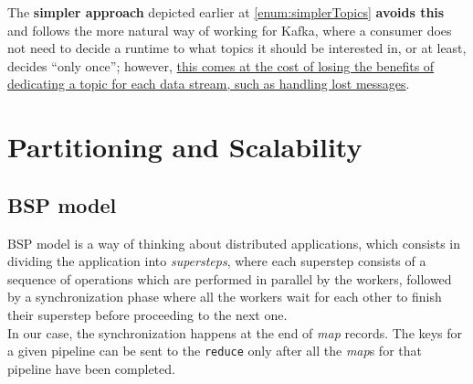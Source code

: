 The \textbf{simpler approach} depicted earlier at \ref{enum:simplerTopics} \textbf{avoids this} and follows the more natural way of working for Kafka, where a consumer does not need to decide a runtime to what topics it should be interested in, or at least, decides ``only once'';
however, \ul{this comes at the cost of losing the benefits of dedicating a topic for each data stream, such as handling lost messages}.




\section{Partitioning and Scalability}
\subsection{BSP model}
BSP model is a way of thinking about distributed applications, which consists in dividing the application into \textit{supersteps}, where each superstep consists of a sequence of operations which are performed in parallel by the workers, followed by a synchronization phase where all the workers wait for each other to finish their superstep before proceeding to the next one.\\
In our case, the synchronization happens at the end of \textit{map} records. The keys for a given pipeline can be sent to the \texttt{reduce} only after all the \textit{map}s for that pipeline have been completed.

